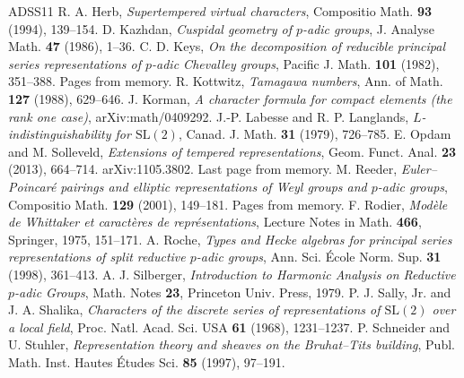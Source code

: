 \documentclass[12pt,letterpaper]{amsart}
\numberwithin{equation}{section}
\theoremstyle{definition}
\theoremstyle{remark}
\begin{document}
\begin{thebibliography}{ADSS11}
 R. A. Herb, \emph{Supertempered virtual characters}, Compositio Math. \textbf{93} (1994), 139--154.
 D. Kazhdan, \emph{Cuspidal geometry of $p$-adic groups}, J. Analyse Math. \textbf{47} (1986), 1--36.
 C. D. Keys, \emph{On the decomposition of reducible principal series representations of $p$-adic Chevalley groups}, Pacific J. Math. \textbf{101} (1982), 351--388. Pages from memory.
 R. Kottwitz, \emph{Tamagawa numbers}, Ann. of Math. \textbf{127} (1988), 629--646.
 J. Korman, \emph{A character formula for compact elements (the rank one case)}, arXiv:math/0409292.
 J.-P. Labesse and R. P. Langlands, \emph{$L$-indistinguishability for $\mathrm{SL}(2)$}, Canad. J. Math. \textbf{31} (1979), 726--785.
 E. Opdam and M. Solleveld, \emph{Extensions of tempered representations}, Geom. Funct. Anal. \textbf{23} (2013), 664--714. arXiv:1105.3802. Last page from memory.
 M. Reeder, \emph{Euler--Poincar\'e pairings and elliptic representations of Weyl groups and $p$-adic groups}, Compositio Math. \textbf{129} (2001), 149--181. Pages from memory.
 F. Rodier, \emph{Mod\`ele de Whittaker et caract\`eres de repr\'esentations}, Lecture Notes in Math. \textbf{466}, Springer, 1975, 151--171.
 A. Roche, \emph{Types and Hecke algebras for principal series representations of split reductive $p$-adic groups}, Ann. Sci. \'Ecole Norm. Sup. \textbf{31} (1998), 361--413.
 A. J. Silberger, \emph{Introduction to Harmonic Analysis on Reductive $p$-adic Groups}, Math. Notes \textbf{23}, Princeton Univ. Press, 1979.
 P. J. Sally, Jr. and J. A. Shalika, \emph{Characters of the discrete series of representations of $\mathrm{SL}(2)$ over a local field}, Proc. Natl. Acad. Sci. USA \textbf{61} (1968), 1231--1237.
 P. Schneider and U. Stuhler, \emph{Representation theory and sheaves on the Bruhat--Tits building}, Publ. Math. Inst. Hautes \'Etudes Sci. \textbf{85} (1997), 97--191.
\end{thebibliography}
\end{document}
